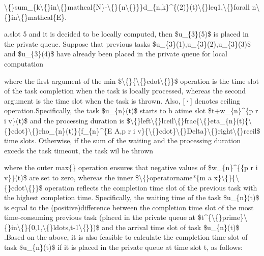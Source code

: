 \documentclass{article}
\begin{document}
\textbackslash\{\}sum\_\{k\textbackslash\{\}in\textbackslash\{\}mathcal\{N\}-\textbackslash\{\}\{n\textbackslash\{\}\}\}d\_\{n,k\}\textasciicircum{}\{(2)\}(t)\textbackslash\{\}leq1,\textbackslash\{\}forall n\textbackslash\{\}in\textbackslash\{\}mathcal\{E\}.

a.slot 5 and it is decided to be locally computed, then \$u\_\{3\}(5)\$ is placed in the private queue. Suppose that previous tasks \$u\_\{3\}(1),u\_\{3\}(2),u\_\{3\}(3)\$ and \$u\_\{3\}(4)\$ have already been placed in the private queue for local computation

where the first argument of the min \$\textbackslash\{\}\{\textbackslash\{\}cdot\textbackslash\{\}\}\$ operation is the time slot of the task completion when the task is locally processed, whereas the second argument is the time slot when the task is thrown. Also, [·] denotes ceiling operation.Specifically, the task \$u\_\{n\}(t)\$ starts to b  atime slot \$t+w\_\{n\}\textasciicircum{}\{p r i v\}(t)\$ and the processing duration is \$\textbackslash\{\}left\textbackslash\{\}lceil\textbackslash\{\}frac\{\textbackslash\{\}eta\_\{n\}(t)\{\textbackslash\{\}cdot\}\textbackslash\{\}rho\_\{n\}(t)\}\{f\_\{n\}\textasciicircum{}\{E A,p r i v\}\{\textbackslash\{\}cdot\}\textbackslash\{\}Delta\}\textbackslash\{\}right\textbackslash\{\}rceil\$ time slots. Otherwise, if the sum of the waiting and the processing duration exceds the task timeout, the task wil be thrown

where the outer max\{\} operation ensures that negative values of \$w\_\{n\}\textasciicircum{}\{\{p r i v\}\}(t)\$ are set to zero, whereas the inner \$\textbackslash\{\}operatorname*\{m a x\}\textbackslash\{\}\{\textbackslash\{\}cdot\textbackslash\{\}\}\$ operation reflects the completion time slot of the previous task with the highest completion time. Specifically, the waiting time of the task \$u\_\{n\}(t)\$ is equal to the (positive)difference between the completion time slot of the most time-consuming previous task (placed in the private queue at \$t\textasciicircum{}\{\textbackslash\{\}prime\}\textbackslash\{\}in\textbackslash\{\}\{0,1,\textbackslash\{\}ldots,t-1\textbackslash\{\}\})\$ and the arrival time slot of task \$u\_\{n\}(t)\$ .Based on the above, it is also feasible to calculate the completion time slot of task \$u\_\{n\}(t)\$ if it is placed in the private queue at time slot t, as follows:
\end{document}
